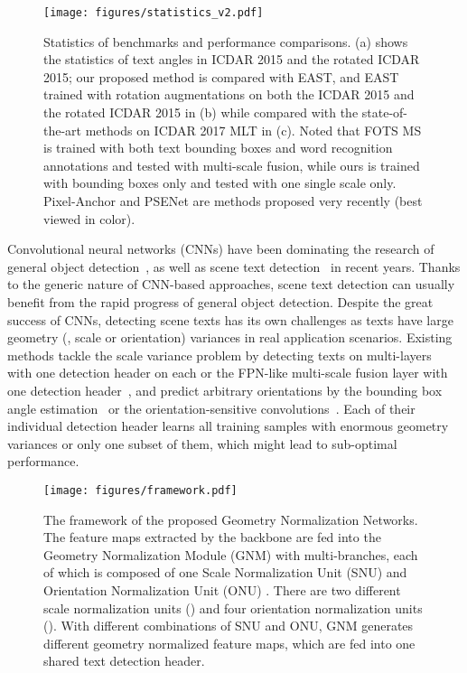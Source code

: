 \documentclass[10pt,twocolumn,letterpaper]{article}
\begin{document}
\begin{figure}
\centering
\texttt{[image: figures/statistics\_v2.pdf]}
\caption{Statistics of benchmarks and performance comparisons. (a) shows the statistics of text angles in ICDAR 2015 and the rotated ICDAR 2015; our proposed method is compared with EAST, and EAST trained with rotation augmentations on both the ICDAR 2015 and the rotated ICDAR 2015 in (b) while compared with the state-of-the-art methods on ICDAR 2017 MLT in (c). Noted that FOTS MS\cite{liu2018fots} is trained with both text bounding boxes and word recognition annotations and tested with multi-scale fusion, while ours is trained  with bounding boxes only and tested  with one single scale only. Pixel-Anchor \cite{Li2018pixel} and PSENet \cite{li2018shape} are methods proposed very recently (best viewed in color). }

\label{fig:statistics}
\end{figure}


Convolutional neural networks (CNNs) have
been dominating the research of general object detection~\cite{Girshick2014a,girshickICCV15fastrcnn,ren2015faster,Liu2016,Redmon2016}, as well as scene text detection~\cite{Tian2016,zhong2016deeptext,Liu2017,Shi2017,Zhou2017,He2017a,Liao2017,Hu2017,wang2018geometry,liu2018fots,lyu2018multi,liao2018rotation,li2018shape,Yue2018} in recent years. Thanks to the generic nature of CNN-based approaches, scene text detection can usually benefit from the rapid progress of general object detection. Despite the great success of CNNs, detecting scene texts  has its own challenges as texts have large geometry (\eg, scale or orientation) variances in real application scenarios.
Existing methods tackle the scale variance problem by detecting texts on multi-layers~\cite{Liao2017,Shi2017,He2017a} with one detection header on each or the FPN-like multi-scale fusion layer with one detection header~\cite{Zhou2017,liu2018fots,li2018shape,wang2018geometry}, and predict arbitrary
orientations by the bounding box angle estimation~\cite{liu2018fots,Zhou2017,Liao2017,He2017a} or the orientation-sensitive convolutions~\cite{wang2018geometry,liao2018rotation,He2017a}. Each of their individual detection header learns all training samples with enormous geometry variances or only one subset of them,
which might lead to sub-optimal performance.

\begin{figure*}[ht]
\centering
\texttt{[image: figures/framework.pdf]}
\caption{The framework of the proposed Geometry Normalization Networks. The feature maps extracted by the backbone are fed into the Geometry Normalization Module (GNM) with  multi-branches, each of which is composed of one Scale Normalization Unit (SNU)  and Orientation Normalization Unit (ONU) . There are two different scale normalization units () and four orientation normalization units (). With different combinations of SNU and ONU, GNM generates different geometry normalized feature maps, which are fed into one shared text detection header. }
\label{fig:framework}
\end{figure*}
\end{document}
